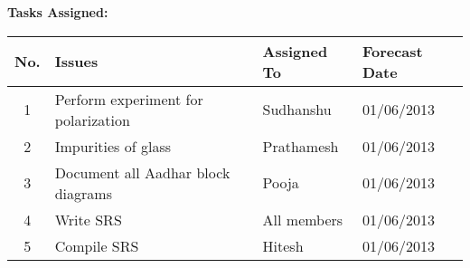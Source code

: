 \documentclass[a4paper,12pt]{article}
\begin{document}
\vskip20pt

\textbf{Tasks Assigned:}
\vskip10pt
\begin{tabular}{|c|p{6cm}|p{3cm}|p{4cm}|}
 \hline
 \hline
 \textbf{No.} & \textbf{Issues} & \textbf{Assigned To} & \textbf{Forecast Date} \\
  \hline
  \hline
1 & Perform experiment for polarization & Sudhanshu & 01/06/2013 \\
  \hline
2 & Impurities of glass & Prathamesh & 01/06/2013 \\
  \hline
3 & Document all Aadhar block diagrams & Pooja & 01/06/2013 \\
  \hline
4 & Write SRS & All members & 01/06/2013 \\
  \hline
5 & Compile SRS & Hitesh & 01/06/2013 \\
  \hline
\end{tabular}
\end{document}
